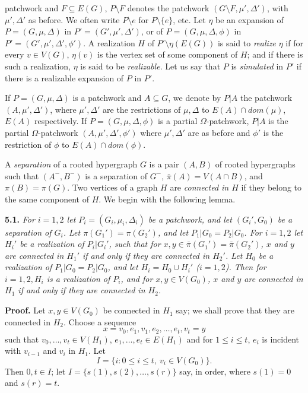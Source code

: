 \noindent patchwork and $F \subseteq E(G)$, $P \setminus F$ denotes the patchwork $(G \setminus F, \mu', \Delta')$, with $\mu', \Delta'$ as before. We often write $P \setminus e$ for $P \setminus \{e\}$, etc. Let $\eta$ be an expansion of $P = (G, \mu, \Delta)$ in $P' = (G', \mu', \Delta')$, or of $P = (G, \mu, \Delta, \phi)$ in $P' = (G', \mu', \Delta', \phi')$. A realization $H$ of $P' \setminus \eta(E(G))$ is said to \textit{realize} $\eta$ if for every $v \in V(G)$, $\eta(v)$ is the vertex set of some component of $H$; and if there is such a realization, $\eta$ is said to be \textit{realizable}. Let us say that $P$ is \textit{simulated} in $P'$ if there is a realizable expansion of $P$ in $P'$.

If $P = (G, \mu, \Delta)$ is a patchwork and $A \subseteq G$, we denote by $P|A$ the patchwork $(A, \mu', \Delta')$, where $\mu', \Delta'$ are the restrictions of $\mu, \Delta$ to $E(A) \cap dom(\mu)$, $E(A)$ respectively. If $P = (G, \mu, \Delta, \phi)$ is a partial $\Omega$-patchwork, $P|A$ is the partial $\Omega$-patchwork $(A, \mu', \Delta', \phi')$ where $\mu', \Delta'$ are as before and $\phi'$ is the restriction of $\phi$ to $E(A) \cap dom(\phi)$.

A \textit{separation} of a rooted hypergraph $G$ is a pair $(A, B)$ of rooted hypergraphs such that $(A^-, B^-)$ is a separation of $G^-$, $\bar{\pi}(A) = V(A \cap B)$, and $\pi(B) = \pi(G)$. Two vertices of a graph $H$ are \textit{connected in $H$} if they belong to the same component of $H$. We begin with the following lemma.

\textbf{5.1.} \textit{For $i = 1, 2$ let $P_i = (G_i, \mu_i, \Delta_i)$ be a patchwork, and let $(G_i', G_0)$ be a separation of $G_i$. Let $\pi(G_1') = \pi(G_2')$, and let $P_1|G_0 = P_2|G_0$. For $i = 1, 2$ let $H_i'$ be a realization of $P_i|G_i'$, such that for $x, y \in \bar{\pi}(G_1') = \bar{\pi}(G_2')$, $x$ and $y$ are connected in $H_1'$ if and only if they are connected in $H_2'$. Let $H_0$ be a realization of $P_1|G_0 = P_2|G_0$, and let $H_i = H_0 \cup H_i'$ ($i = 1, 2$). Then for $i = 1, 2, H_i$ is a realization of $P_i$, and for $x, y \in V(G_0)$, $x$ and $y$ are connected in $H_1$ if and only if they are connected in $H_2$.}

\textbf{Proof.} Let $x, y \in V(G_0)$ be connected in $H_1$ say; we shall prove that they are connected in $H_2$. Choose a sequence
\begin{equation*}
x = v_0, e_1, v_1, e_2, \dots, e_t, v_t = y
\end{equation*}
such that $v_0, \dots, v_t \in V(H_1)$, $e_1, \dots, e_t \in E(H_1)$ and for $1 \le i \le t$, $e_i$ is incident with $v_{i-1}$ and $v_i$ in $H_1$. Let
\begin{equation*}
I = \{i \colon 0 \le i \le t, \ v_i \in V(G_0)\}.
\end{equation*}
Then $0, t \in I$; let $I = \{s(1), s(2), \dots, s(r)\}$ say, in order, where $s(1) = 0$ and $s(r) = t$.

